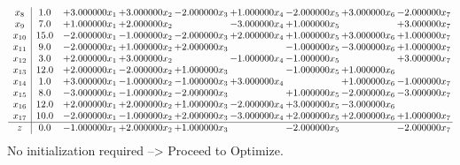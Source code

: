 \documentclass[10pt]{article}
\begin{document}
\[\begin{array}{c| c c@{\hskip 2pt} c@{\hskip 2pt} c@{\hskip 2pt} c@{\hskip 2pt} c@{\hskip 2pt} c@{\hskip 2pt} c@{\hskip 2pt} }
 x_{8}   &  1.0 & + 3.000000 x_{1} & + 3.000000 x_{2} & -2.000000 x_{3} & + 1.000000 x_{4} & -2.000000 x_{5} & + 3.000000 x_{6} & -2.000000 x_{7}\\
 x_{9}   &  7.0 & + 1.000000 x_{1} & + 2.000000 x_{2} &   & -3.000000 x_{4} & + 1.000000 x_{5} &   & + 3.000000 x_{7}\\
 x_{10}   &  15.0 & -2.000000 x_{1} & -1.000000 x_{2} & -2.000000 x_{3} & + 2.000000 x_{4} & + 1.000000 x_{5} & + 3.000000 x_{6} & + 1.000000 x_{7}\\
 x_{11}   &  9.0 & -2.000000 x_{1} & + 1.000000 x_{2} & + 2.000000 x_{3} &   & -1.000000 x_{5} & -3.000000 x_{6} & + 1.000000 x_{7}\\
 x_{12}   &  3.0 & + 2.000000 x_{1} & + 3.000000 x_{2} &   & -1.000000 x_{4} & -1.000000 x_{5} &   & + 3.000000 x_{7}\\
 x_{13}   &  12.0 & + 2.000000 x_{1} & -2.000000 x_{2} & + 1.000000 x_{3} &   & -1.000000 x_{5} & + 1.000000 x_{6} &   \\
 x_{14}   &  1.0 & + 3.000000 x_{1} & -1.000000 x_{2} & -1.000000 x_{3} & + 3.000000 x_{4} &   & + 1.000000 x_{6} & -1.000000 x_{7}\\
 x_{15}   &  8.0 & -3.000000 x_{1} & -1.000000 x_{2} & -2.000000 x_{3} &   & + 1.000000 x_{5} & -2.000000 x_{6} & -3.000000 x_{7}\\
 x_{16}   &  12.0 & + 2.000000 x_{1} & + 2.000000 x_{2} & + 1.000000 x_{3} & -2.000000 x_{4} & + 3.000000 x_{5} & -3.000000 x_{6} &   \\
 x_{17}   &  10.0 & -2.000000 x_{1} & -1.000000 x_{2} & + 2.000000 x_{3} & -3.000000 x_{4} & + 2.000000 x_{5} & + 2.000000 x_{6} & + 1.000000 x_{7}\\
\hline
z    &  0.0 & -1.000000 x_{1} & + 2.000000 x_{2} & + 1.000000 x_{3} &   & -2.000000 x_{5} &   & -2.000000 x_{7}\\
\end{array}\]
No initialization required --> Proceed to Optimize. 
\end{document}
